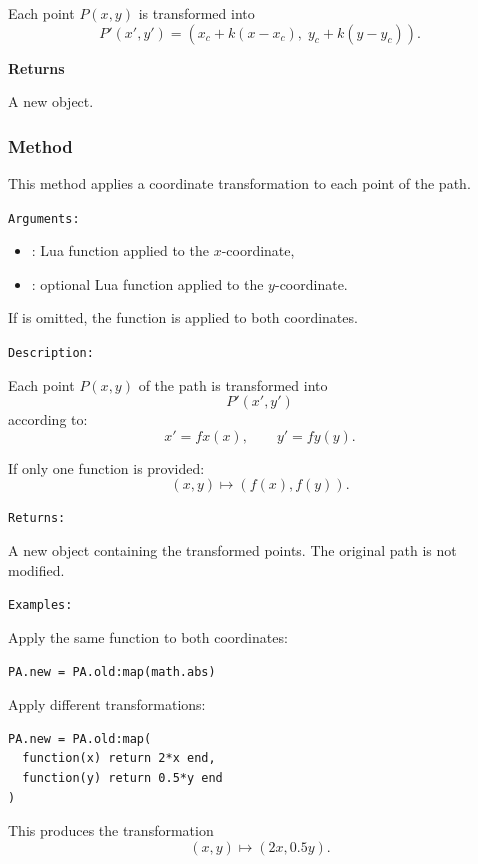 Each point $P(x,y)$ is transformed into
\[
P'(x',y') = (x_c + k(x - x_c),\; y_c + k(y - y_c)).
\]

\medskip

\textbf{Returns}

A new  object.

\subsubsection{Method }
\label{ssub:path_map}

This method applies a coordinate transformation to each point of the path.

\medskip

\texttt{Arguments: }
\begin{itemize}
  \item {} : Lua function applied to the $x$-coordinate,
  \item {} : optional Lua function applied to the $y$-coordinate.
\end{itemize}

If  is omitted, the function  is applied to both coordinates.

\medskip

\texttt{Description: }

Each point $P(x,y)$ of the path is transformed into
\[
P'(x',y')
\]
according to:
\[
x' = fx(x),
\qquad
y' = fy(y).
\]

If only one function is provided:
\[
(x,y) \mapsto (f(x), f(y)).
\]

\medskip

\texttt{Returns: }

A new  object containing the transformed points.
The original path is not modified.

\medskip

\texttt{Examples: }

Apply the same function to both coordinates:

\begin{verbatim}
PA.new = PA.old:map(math.abs)
\end{verbatim}

Apply different transformations:

\begin{verbatim}
PA.new = PA.old:map(
  function(x) return 2*x end,
  function(y) return 0.5*y end
)
\end{verbatim}

This produces the transformation
\[
(x,y) \mapsto (2x, 0.5y).
\]




